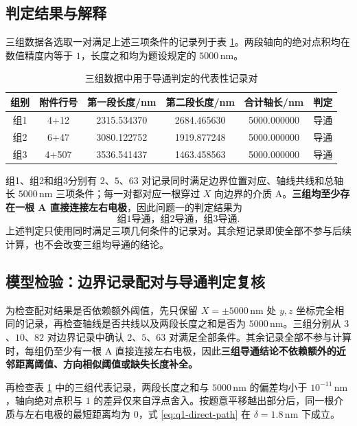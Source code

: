 \documentclass[withoutpreface,bwprint]{cumcmthesis}
\begin{document}
\subsection{判定结果与解释}

三组数据各选取一对满足上述三项条件的记录列于表 \ref{tab:q1-representative}。两段轴向的绝对点积均在数值精度内等于 $1$，长度之和均为题设规定的 $5000\,\mathrm{nm}$。

\begin{table}[H]
\centering
\caption{三组数据中用于导通判定的代表性记录对}
\label{tab:q1-representative}
\begin{tabular}{cccccc}
\toprule
组别 & 附件行号 & 第一段长度/nm & 第二段长度/nm & 合计轴长/nm & 判定 \\
\midrule
组1 & 4+12   & 2315.534370 & 2684.465630 & 5000.000000 & 导通 \\
组2 & 6+47   & 3080.122752 & 1919.877248 & 5000.000000 & 导通 \\
组3 & 4+507  & 3536.541437 & 1463.458563 & 5000.000000 & 导通 \\
\bottomrule
\end{tabular}
\end{table}

组1、组2和组3分别有 $2$、$5$、$63$ 对记录同时满足边界位置对应、轴线共线和总轴长 $5000\,\mathrm{nm}$ 三项条件；每一对都对应一根穿过 $X$ 向边界的介质 A。\textbf{三组均至少存在一根 A 直接连接左右电极}，因此问题一的判定结果为
\begin{equation}
 \boxed{\text{组1导通，组2导通，组3导通}}.
 \label{eq:q1-result}
\end{equation}
上述判定只使用同时满足三项几何条件的记录对。其余短记录即使全部不参与后续计算，也不会改变三组均导通的结论。

\subsection{模型检验：边界记录配对与导通判定复核}

为检查配对结果是否依赖额外阈值，先只保留 $X=\pm5000\,\mathrm{nm}$ 处 $y,z$ 坐标完全相同的记录，再检查轴线是否共线以及两段长度之和是否为 $5000\,\mathrm{nm}$。三组分别从 $3$、$10$、$82$ 对边界记录中确认 $2$、$5$、$63$ 对满足全部条件。其余记录全部不参与计算时，每组仍至少有一根 A 直接连接左右电极，因此\textbf{三组导通结论不依赖额外的近邻距离阈值、方向相似阈值或缺失长度补全。}

再检查表 \ref{tab:q1-representative} 中的三组代表记录，两段长度之和与 $5000\,\mathrm{nm}$ 的偏差均小于 $10^{-11}\,\mathrm{nm}$，轴向绝对点积与 $1$ 的差异仅来自浮点舍入。按题意平移越出部分后，同一根介质与左右电极的最短距离均为 $0$，式 \eqref{eq:q1-direct-path} 在 $\delta=1.8\,\mathrm{nm}$ 下成立。
\end{document}
